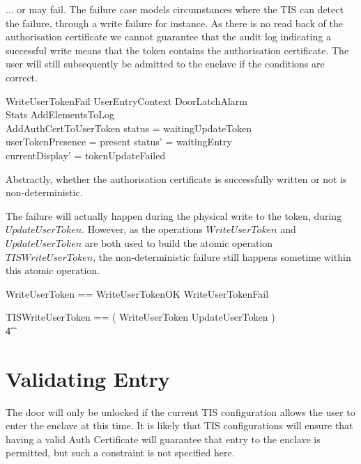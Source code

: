 ... or may fail. The failure case models circumstances where the TIS
can detect the failure, through a write failure for instance. 
As there is no read back of the authorisation certificate we cannot
guarantee that the audit log indicating a successful write means that
the token contains the authorisation certificate. The user will still
subsequently be admitted to the enclave if the conditions are correct. 

\begin{schema}{WriteUserTokenFail}
	UserEntryContext
\also
	\Xi DoorLatchAlarm
\\      \Xi Stats
\also
        AddElementsToLog
\\      AddAuthCertToUserToken
\where
	status = waitingUpdateToken
\\      userTokenPresence = present
\also
        status' = waitingEntry
\\      currentDisplay' = tokenUpdateFailed
\end{schema}


Abstractly, whether the authorisation certificate is successfully
written or not is non-deterministic.   

The failure will actually happen during the physical write to the
token, during $UpdateUserToken$. However, as the
operations $WriteUserToken$ and $UpdateUserToken$ are both used to
build the atomic operation $TISWriteUserToken$, the non-deterministic 
failure still happens sometime within this atomic operation.

\begin{zed}
WriteUserToken == WriteUserTokenOK \lor WriteUserTokenFail
\end{zed}

\begin{zed}
        TISWriteUserToken == (
        WriteUserToken \semi UpdateUserToken )
\\ \t4          \lor [~ UserTokenTorn | status = waitingUpdateToken ~] 
\end{zed}



\section{Validating Entry}

The door will only be unlocked if the current TIS configuration allows
the user to enter the enclave at this time. It is likely that TIS
configurations will ensure that having a valid Auth Certificate will
guarantee that entry to the enclave is permitted, but such a
constraint is not specified here. 

